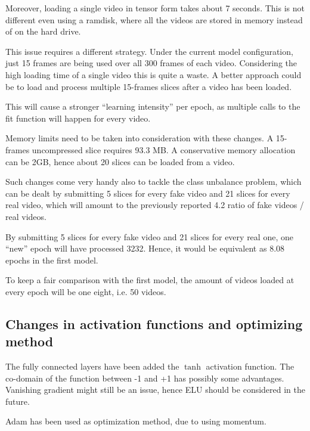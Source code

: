 Moreover, loading a single video in tensor form takes about 7 seconds.
This is not different even using a ramdisk, where all the videos are stored in
memory instead of on the hard drive.

This issue requires a different strategy. Under the current model configuration,
just 15 frames are being used over all 300 frames of each video. Considering the
high loading time of a single video this is quite a waste.
A better approach could be to load and process multiple 15-frames slices after a video
has been loaded.

This will cause a stronger ``learning intensity'' per epoch, as multiple calls to
the fit function will happen for every video.

Memory limits need to be taken into consideration with these changes.
A 15-frames uncompressed slice requires 93.3 MB. A conservative memory allocation
can be 2GB, hence about 20 slices can be loaded from a video.

Such changes come very handy also to tackle the class unbalance problem, which can
be dealt by submitting 5 slices for every fake video and 21 slices for every real
video, which will amount to the previously reported 4.2 ratio of fake videos / real videos.

By submitting 5 slices for every fake video and 21 slices for every real one, one ``new'' 
epoch will have processed 3232. Hence, it would be equivalent as $8.08$ epochs in the 
first model.

To keep a fair comparison with the first model, the amount of videos loaded at every epoch
will be one eight, i.e. 50 videos.

\subsection{Changes in activation functions and optimizing method}

The fully connected layers have been added the $\tanh$ activation function.
The co-domain of the function between -1 and +1 has possibly some advantages.
Vanishing gradient might still be an issue, hence ELU should be considered in the future.

Adam has been used as optimization method, due to using momentum.
